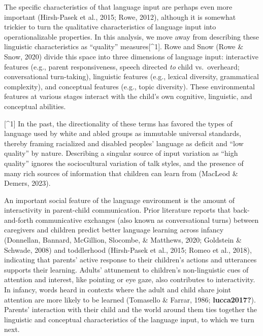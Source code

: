 \documentclass[
  man,floatsintext]{apa6}
\begin{document}
The specific characteristics of that language input are perhaps even more important (Hirsh-Pasek et al., 2015; Rowe, 2012), although it is somewhat trickier to turn the qualitative characteristics of language input into operationalizable properties. In this analysis, we move away from describing these linguistic characteristics as ``quality'' measures{[}\^{}1{]}. Rowe and Snow (Rowe \& Snow, 2020) divide this space into three dimensions of language input: interactive features (e.g., parent responsiveness, speech directed \emph{to} child vs.~overheard; conversational turn-taking), linguistic features (e.g., lexical diversity, grammatical complexity), and conceptual features (e.g., topic diversity). These environmental features at various stages interact with the child's own cognitive, linguistic, and conceptual abilities.

{[}\^{}1{]} In the past, the directionality of these terms has favored the types of language used by white and abled groups as immutable universal standards, thereby framing racialized and disabled peoples' language as deficit and ``low quality'' by nature. Describing a singular source of input variation as ``high quality'' ignores the sociocultural variation of talk styles, and the presence of many rich sources of information that children can learn from (MacLeod \& Demers, 2023).

An important social feature of the language environment is the amount of interactivity in parent-child communication. Prior literature reports that back-and-forth communicative exchanges (also known as conversational turns) between caregivers and children predict better language learning across infancy (Donnellan, Bannard, McGillion, Slocombe, \& Matthews, 2020; Goldstein \& Schwade, 2008) and toddlerhood (Hirsh-Pasek et al., 2015; Romeo et al., 2018), indicating that parents' active response to their children's actions and utterances supports their learning. Adults' attunement to children's non-linguistic cues of attention and interest, like pointing or eye gaze, also contributes to interactivity. In infancy, words heard in contexts where the adult and child share joint attention are more likely to be learned (Tomasello \& Farrar, 1986; \textbf{lucca2017?}). Parents' interaction with their child and the world around them ties together the linguistic and conceptual characteristics of the language input, to which we turn next.
\end{document}

